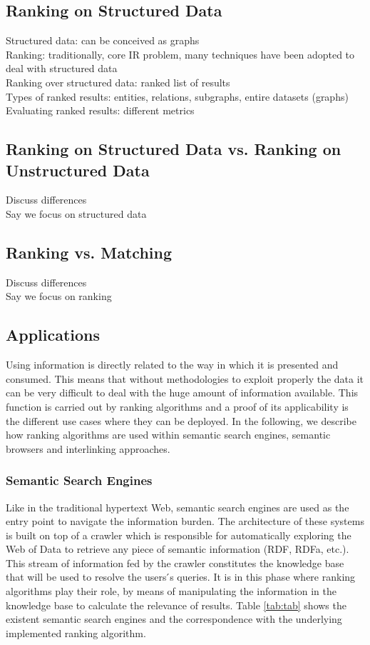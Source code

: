 \subsection{Ranking on Structured Data}
Structured data: can be conceived as graphs\\
Ranking: traditionally, core IR problem, many techniques have been adopted to deal with structured data\\
Ranking over structured data: ranked list of results\\
Types of ranked results: entities, relations, subgraphs, entire datasets (graphs)\\
Evaluating ranked results: different metrics\\

\subsection{Ranking on Structured Data vs. Ranking on Unstructured Data}
Discuss differences\\
Say we focus on structured data\\

\subsection{Ranking vs. Matching}
Discuss differences\\
Say we focus on ranking\\


\subsection{Applications} 
Using information is directly related to the way in which it is presented and consumed. This means that without methodologies to exploit properly the data it can be very difficult to deal with the huge amount of information available. This function is carried out by ranking algorithms and a proof of its applicability is the different use cases where they can be deployed. In the following, we describe how ranking algorithms are used within semantic search engines, semantic browsers and interlinking approaches.

\subsubsection{Semantic Search Engines}
Like in the traditional hypertext Web, semantic search engines are used as the entry point to navigate the information burden. The architecture of these systems is built on top of a crawler which is responsible for automatically exploring the Web of Data to retrieve any piece of semantic information (RDF, RDFa, etc.). This stream of information fed by the crawler constitutes the knowledge base that will be used to resolve the users ́s queries. It is in this phase where ranking algorithms play their role, by means of manipulating the information in the knowledge base to calculate the relevance of results.
Table \ref{tab:tab} shows the existent semantic search engines and the correspondence with the underlying implemented ranking algorithm.

